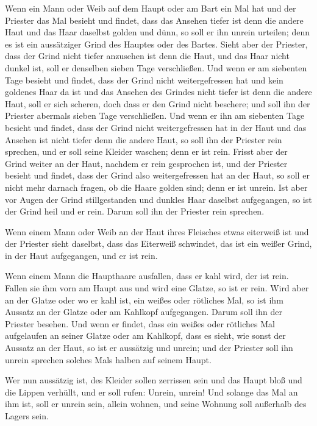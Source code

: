  Wenn ein Mann oder Weib auf dem Haupt oder am Bart ein Mal
hat  und der Priester das Mal besieht und findet, dass das
Ansehen tiefer ist denn die andere Haut und das Haar daselbst golden und
dünn, so soll er ihn unrein urteilen; denn es ist ein aussätziger Grind
des Hauptes oder des Bartes.  Sieht aber der Priester, dass
der Grind nicht tiefer anzusehen ist denn die Haut, und das Haar nicht
dunkel ist, soll er denselben sieben Tage verschließen. 
Und wenn er am siebenten Tage besieht und findet, dass der Grind nicht
weitergefressen hat und kein goldenes Haar da ist und das Ansehen des
Grindes nicht tiefer ist denn die andere Haut,  soll er
sich scheren, doch dass er den Grind nicht beschere; und soll ihn der
Priester abermals sieben Tage verschließen.  Und wenn er
ihn am siebenten Tage besieht und findet, dass der Grind nicht
weitergefressen hat in der Haut und das Ansehen ist nicht tiefer denn
die andere Haut, so soll ihn der Priester rein sprechen, und er soll
seine Kleider waschen; denn er ist rein.  Frisst aber der
Grind weiter an der Haut, nachdem er rein gesprochen ist, 
und der Priester besieht und findet, dass der Grind also weitergefressen
hat an der Haut, so soll er nicht mehr darnach fragen, ob die Haare
golden sind; denn er ist unrein.  Ist aber vor Augen der
Grind stillgestanden und dunkles Haar daselbst aufgegangen, so ist der
Grind heil und er rein. Darum soll ihn der Priester rein sprechen.

 Wenn einem Mann oder Weib an der Haut ihres Fleisches
etwas eiterweiß ist  und der Priester sieht daselbst, dass
das Eiterweiß schwindet, das ist ein weißer Grind, in der Haut
aufgegangen, und er ist rein.

 Wenn einem Mann die Haupthaare ausfallen, dass er kahl
wird, der ist rein.  Fallen sie ihm vorn am Haupt aus und
wird eine Glatze, so ist er rein.  Wird aber an der Glatze
oder wo er kahl ist, ein weißes oder rötliches Mal, so ist ihm Aussatz
an der Glatze oder am Kahlkopf aufgegangen.  Darum soll ihn
der Priester besehen. Und wenn er findet, dass ein weißes oder rötliches
Mal aufgelaufen an seiner Glatze oder am Kahlkopf, dass es sieht, wie
sonst der Aussatz an der Haut,  so ist er aussätzig und
unrein; und der Priester soll ihn unrein sprechen solches Mals halben
auf seinem Haupt.

 Wer nun aussätzig ist, des Kleider sollen zerrissen sein
und das Haupt bloß und die Lippen verhüllt, und er soll rufen: Unrein,
unrein!  Und solange das Mal an ihm ist, soll er unrein
sein, allein wohnen, und seine Wohnung soll außerhalb des Lagers sein.

